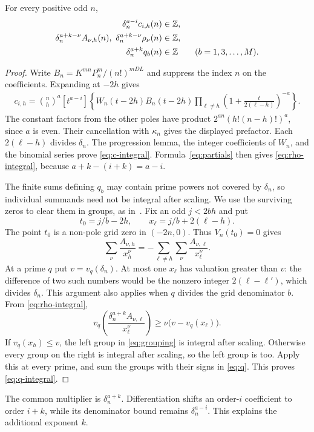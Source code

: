\begin{proposition}\label{prop:denominators}
For every positive odd $n$,
\begin{align}
 \delta_n^{a-i}c_{i,h}(n)&\in\mathbb Z,\label{eq:c-integral}\\
 \delta_n^{a+k-\nu}A_{\nu,h}(n),\
 \delta_n^{a+k-\nu}\rho_\nu(n)&\in\mathbb Z,\label{eq:rho-integral}\\
 \delta_n^{a+k}q_b(n)&\in\mathbb Z
                       \qquad(b=1,3,\ldots,M).\label{eq:q-integral}
\end{align}
\end{proposition}
\begin{proof}
Write $B_n=K^{mn}P_n^m/(n!)^{mDL}$ and suppress the index $n$
on the coefficients. Expanding at $-2h$ gives
\begin{equation}\label{eq:local-coefficient}
 \begin{split}
 c_{i,h}=\binom nh^a[t^{a-i}]
 \left\{W_n(t-2h)B_n(t-2h)
       \prod_{\ell\ne h}\left(1+\frac{t}{2(\ell-h)}\right)^{-a}
 \right\}.
 \end{split}
\end{equation}
The constant factors from the other poles have product
$2^{an}(h!(n-h)!)^a$, since $a$ is even.
Their cancellation with $\kappa_n$ gives the displayed prefactor.
Each $2(\ell-h)$ divides $\delta_n$. The progression lemma,
the integer coefficients of $W_n$, and the binomial series
prove \eqref{eq:c-integral}.
Formula~\eqref{eq:partials} then gives \eqref{eq:rho-integral},
because $a+k-(i+k)=a-i$.

The finite sums defining $q_b$ may contain prime powers not
covered by $\delta_n$, so individual summands need not be integral
after scaling. We use the surviving zeros to clear them in groups,
as in~\cite[Section~4]{Tcount}.
Fix an odd $j<2bh$ and put
\[
 t_0=j/b-2h,\qquad x_\ell=j/b+2(\ell-h).
\]
The point $t_0$ is a non-pole grid zero in $(-2n,0)$.
Thus $V_n(t_0)=0$ gives
\begin{equation}\label{eq:grouping}
 \sum_\nu\frac{A_{\nu,h}}{x_h^\nu}
       =-\sum_{\ell\ne h}\sum_\nu\frac{A_{\nu,\ell}}{x_\ell^\nu}.
\end{equation}
At a prime $q$ put $v=v_q(\delta_n)$. At most one $x_\ell$
has valuation greater than $v$: the difference of two such
numbers would be the nonzero integer $2(\ell-\ell')$,
which divides $\delta_n$. This argument also applies when
$q$ divides the grid denominator $b$.
From \eqref{eq:rho-integral},
\[
 v_q\!\left(\frac{\delta_n^{a+k}A_{\nu,\ell}}{x_\ell^\nu}\right)
                 \ge\nu\bigl(v-v_q(x_\ell)\bigr).
\]
If $v_q(x_h)\le v$, the left group in \eqref{eq:grouping}
is integral after scaling. Otherwise every group on the right
is integral after scaling, so the left group is too.
Apply this at every prime, and sum the groups with their signs
in \eqref{eq:q}. This proves \eqref{eq:q-integral}.
\end{proof}

The common multiplier is $\delta_n^{a+k}$.
Differentiation shifts an order-$i$ coefficient to order $i+k$,
while its denominator bound remains $\delta_n^{a-i}$.
This explains the additional exponent $k$.
